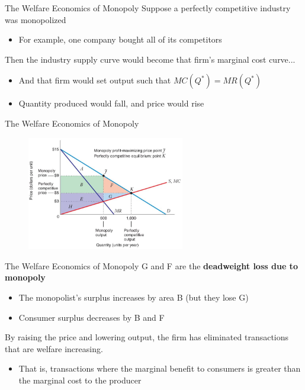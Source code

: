 \documentclass[11pt,t]{beamer}
\begin{document}
\begin{frame}{The Welfare Economics of Monopoly}
  Suppose a perfectly competitive industry was monopolized
  \begin{itemize}
    \item For example, one company bought all of its competitors
  \end{itemize}

  Then the industry supply curve would become that firm's marginal cost curve...

  \begin{itemize}
    \item And that firm would set output such that $MC(Q^*) = MR(Q^*)$
    
    \item Quantity produced would fall, and price would rise
  \end{itemize}
\end{frame}

\begin{frame}{The Welfare Economics of Monopoly}
  \begin{figure}
    \includegraphics[width=260px]{figures/fig11_16a.jpg}
  \end{figure}
\end{frame}

\begin{frame}{The Welfare Economics of Monopoly}
  G and F are the \textbf{deadweight loss due to monopoly}
  \begin{itemize}
    \item The monopolist's surplus increases by area B (but they lose G)
    
    \item Consumer surplus decreases by B and F
  \end{itemize}

  \bigskip
  By raising the price and lowering output, the firm has eliminated transactions that are welfare increasing.

  \begin{itemize}
    \item That is, transactions where the marginal benefit to consumers is greater than the marginal cost to the producer
  \end{itemize}
\end{frame}
\end{document}
